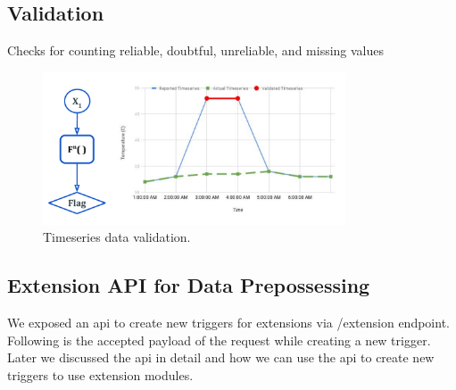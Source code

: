 \subsection{Validation}
Checks for counting reliable, doubtful, unreliable, and missing values
\begin{figure}[htp]
    \centering
    \includegraphics[width=0.8\textwidth]{method/data_preprocess/validation.pdf}
    \caption{Timeseries data validation.}
    \label{fi:validation}
\end{figure}

\subsection{Extension API for Data Prepossessing}

We exposed an \acrshort{api} to create new triggers for extensions via /extension endpoint. Following is the accepted payload of the request while creating a new trigger. Later we discussed the \acrshort{api} in detail and how we can use the \acrshort{api} to create new triggers to use extension modules.

